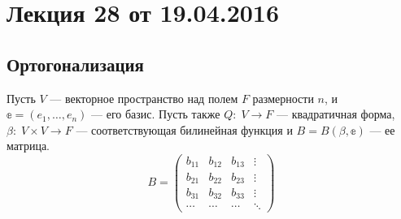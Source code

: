 \renewcommand{\f}{\mathbb{f}}

\section{Лекция 28 от 19.04.2016}

\subsection*{Ортогонализация}
Пусть $V$ --- векторное пространство над полем $F$ размерности $n$, и $\mathbb{e} = (e_1, \ldots, e_n)$ --- его базис. Пусть также $Q\colon \; V \to F$ --- квадратичная форма, $\beta\colon\; V\times V \to F$ --- соответствующая билинейная функция и $B = B(\beta, \mathbb{e})$ --- ее матрица.
$$
B = \begin{pmatrix}
	b_{11}& b_{12} & b_{13} & \vdots\\
	b_{21}& b_{22} & b_{23} & \vdots\\
	b_{31}& b_{32}& b_{33} & \vdots\\
	\cdots& \cdots& \cdots& \ddots
\end{pmatrix}
$$

